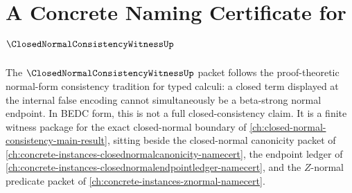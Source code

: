 \chapter{A Concrete Naming Certificate for $\ClosedNormalConsistencyWitnessUp$}
\label{ch:concrete-instances-closed-normal-consistency-witness-namecert}

The $\ClosedNormalConsistencyWitnessUp$ packet follows the proof-theoretic normal-form consistency tradition for typed calculi: a closed term displayed at the internal false encoding cannot simultaneously be a beta-strong normal endpoint. In BEDC form, this is not a full closed-consistency claim. It is a finite witness package for the exact closed-normal boundary of \autoref{ch:closed-normal-consistency-main-result}, sitting beside the closed-normal canonicity packet of \autoref{ch:concrete-instances-closednormalcanonicity-namecert}, the endpoint ledger of \autoref{ch:concrete-instances-closednormalendpointledger-namecert}, and the $Z$-normal predicate packet of \autoref{ch:concrete-instances-znormal-namecert}.

